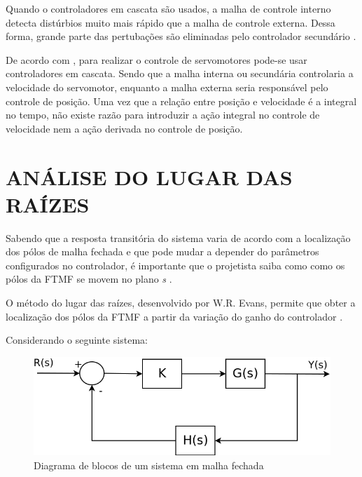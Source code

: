 \documentclass[12pt,oneside,a4paper, chapter=TITLE, section = TITLE, english, brazil]{abntex2}
\begin{document}
Quando o controladores em cascata são usados, a malha de controle interno detecta distúrbios muito mais rápido que a malha de controle externa. Dessa forma, grande parte das pertubações são eliminadas pelo controlador secundário \cite{astrom}.

De acordo com , para realizar o controle de servomotores pode-se usar controladores em cascata. Sendo que a malha interna ou secundária controlaria a velocidade do servomotor, enquanto a malha externa seria responsável pelo controle de posição. Uma vez que a relação entre posição e velocidade é a integral no tempo, não existe razão para introduzir a ação integral no controle de velocidade nem a ação derivada no controle de posição.

\section{ANÁLISE DO LUGAR DAS RAÍZES} %

Sabendo que a resposta transitória do sistema varia de acordo com a localização dos pólos de malha fechada e que pode mudar a depender do parâmetros configurados no controlador, é importante que o projetista saiba como como os pólos da FTMF se movem no plano \textit{s} \cite{ogata}.

O método do lugar das raízes, desenvolvido por W.R. Evans, permite que obter a localização dos pólos da FTMF a partir da variação do ganho do controlador \cite{ogata}.

Considerando o seguinte sistema:

\begin{figure}[h] %
\centering
\includegraphics[scale=0.45]{./imagens/Malha_fechada2}
\caption[Diagrama de blocos de um sistema em malha fechada]{Diagrama de blocos de um sistema em malha fechada}
\label{fig:malha_fechada2}
\end{figure}
\end{document}
